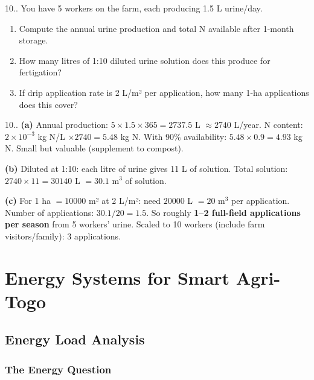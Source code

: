 \documentclass[12pt,a4paper,openany]{book}
\newcounter{exoctr}[chapter]
\renewcommand{\theexoctr}{\thechapter.\arabic{exoctr}}
\begin{document}
\begin{exobox}{10.\theexoctr}
You have 5 workers on the farm, each producing 1.5 L urine/day.
\begin{enumerate}[label=(\alph*)]
  \item Compute the annual urine production and total N available after 1-month storage.
  \item How many litres of 1:10 diluted urine solution does this produce for fertigation?
  \item If drip application rate is 2 L/m² per application, how many 1-ha applications does this cover?
\end{enumerate}
\end{exobox}

\begin{solbox}{10.\theexoctr}
\textbf{(a)} Annual production: $5\times1.5\times365=2737.5$ L $\approx2740$ L/year. N content: $2\times10^{-3}$ kg N/L $\times 2740=5.48$ kg N. With 90\% availability: $5.48\times0.9=4.93$ kg N. Small but valuable (supplement to compost).

\textbf{(b)} Diluted at 1:10: each litre of urine gives 11 L of solution. Total solution: $2740\times11=30140$ L $=30.1$ m$^3$ of solution.

\textbf{(c)} For 1 ha $=10000$ m² at 2 L/m²: need $20000$ L $=20$ m$^3$ per application. Number of applications: $30.1/20=\mathbf{1.5}$. So roughly \textbf{1--2 full-field applications per season} from 5 workers' urine. Scaled to 10 workers (include farm visitors/family): 3 applications.
\end{solbox}

\part{Energy Systems for Smart Agri-Togo}

\chapter{Energy Load Analysis}
\label{chap:energy_load}

\section{The Energy Question}
\end{document}
